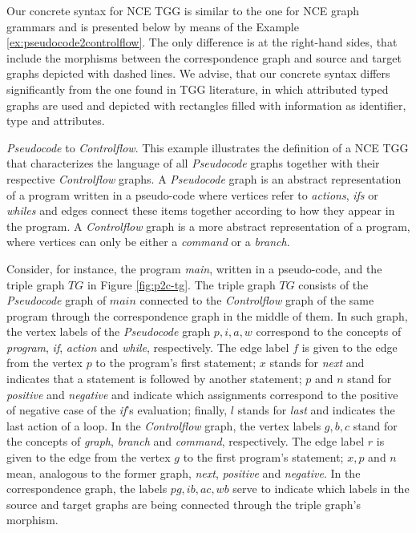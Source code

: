 Our concrete syntax for NCE TGG is similar to the one for NCE graph grammars and is presented below by means of the Example \ref{ex:pseudocode2controlflow}. The only difference is at the right-hand sides, that include the morphisms between the correspondence graph and source and target graphs depicted with dashed lines. We advise, that our concrete syntax differs significantly from the one found in TGG literature, in which attributed typed graphs are used and depicted with rectangles filled with information as identifier, type and attributes.

\begin{example}{\emph{Pseudocode} to \emph{Controlflow}.}
	\label{ex:pseudocode2controlflow}
	This example illustrates the definition of a NCE TGG that characterizes the language of all \emph{Pseudocode} graphs together with their respective \emph{Controlflow} graphs. A \emph{Pseudocode} graph is an abstract representation of a program written in a pseudo-code where vertices refer to \emph{actions}, \emph{ifs} or \emph{whiles} and edges connect these items together according to how they appear in the program. A \emph{Controlflow} graph is a more abstract representation of a program, where vertices can only be either a \emph{command} or a \emph{branch}.
	
	Consider, for instance, the program \emph{main}, written in a pseudo-code, and the triple graph $TG$ in Figure \ref{fig:p2c-tg}. The triple graph $TG$ consists of the \emph{Pseudocode} graph of $main$ connected to the \emph{Controlflow} graph of the same program through the correspondence graph in the middle of them. In such graph, the vertex labels of the \emph{Pseudocode} graph $p, i, a, w$ correspond to the concepts of \emph{program}, \emph{if}, \emph{action} and \emph{while}, respectively. The edge label $f$ is given to the edge from the vertex $p$ to the program's first statement; $x$ stands for \emph{next} and indicates that a statement is followed by another statement; $p$ and $n$ stand for \emph{positive} and \emph{negative} and indicate which assignments correspond to the positive of negative case of the \emph{if}'s evaluation; finally, $l$ stands for \emph{last} and indicates the last action of a loop. In the \emph{Controlflow} graph, the vertex labels $g, b, c$ stand for the concepts of \emph{graph}, \emph{branch} and \emph{command}, respectively. The edge label $r$ is given to the edge from the vertex $g$ to the first program's statement; $x, p$ and $n$ mean, analogous to the former graph, \emph{next}, \emph{positive} and \emph{negative}. In the correspondence graph, the labels $pg, ib, ac, wb$ serve to indicate which labels in the source and target graphs are being connected through the triple graph's morphism.
	

\end{example}
